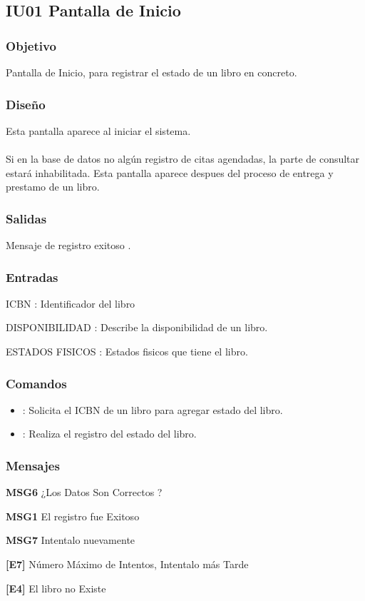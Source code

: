 \newpage
\subsection{IU01 Pantalla de Inicio}

\subsubsection{Objetivo}
	Pantalla de Inicio, para registrar el estado de un libro en concreto.

\subsubsection{Diseño}
	Esta pantalla aparece al iniciar el sistema.  \\\\
	Si en la base de datos no algún registro de citas agendadas, la parte de consultar estará inhabilitada. 
	Esta pantalla aparece despues del proceso de entrega y prestamo de un libro.


\subsubsection{Salidas}
	\begin{Citemize}
		\item Mensaje de registro exitoso . 
	\end{Citemize}
	
\subsubsection{Entradas}
	\begin{Citemize}
		\item ICBN : Identificador del libro
		\item DISPONIBILIDAD : Describe la disponibilidad de un libro.
		\item ESTADOS FISICOS : Estados fisicos que tiene el libro.
	\end{Citemize}

\subsubsection{Comandos} 
\begin{itemize}
	\item {}: Solicita el ICBN de un libro para agregar estado del libro.
	\item {}: Realiza el registro del estado del libro.
\end{itemize}

\subsubsection{Mensajes}
	\begin{Citemize}
		\item {\bf  MSG6} ¿Los Datos Son Correctos ?
		\item {\bf  MSG1} El registro fue Exitoso
		\item {\bf  MSG7} Intentalo nuevamente
		\item {\bf  [E7]} Número Máximo de Intentos, Intentalo más Tarde
		 \item {\bf [E4]} El libro no Existe
	\end{Citemize}
